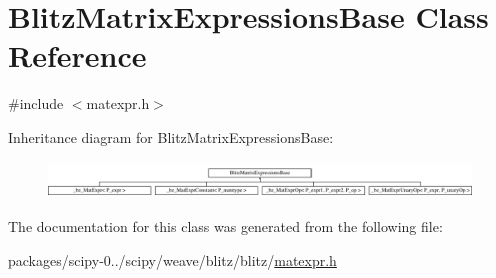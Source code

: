 \hypertarget{classBlitzMatrixExpressionsBase}{}\section{Blitz\+Matrix\+Expressions\+Base Class Reference}
\label{classBlitzMatrixExpressionsBase}


{\ttfamily \#include $<$matexpr.\+h$>$}

Inheritance diagram for Blitz\+Matrix\+Expressions\+Base\+:\begin{figure}[H]
\begin{center}
\leavevmode
\includegraphics[height=0.989399cm]{classBlitzMatrixExpressionsBase}
\end{center}
\end{figure}


The documentation for this class was generated from the following file\+:\begin{DoxyCompactItemize}
\item 
packages/scipy-\/0../scipy/weave/blitz/blitz/\hyperlink{matexpr_8h}{matexpr.\+h}\end{DoxyCompactItemize}
